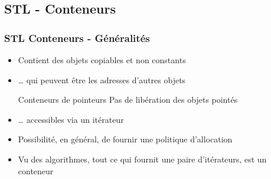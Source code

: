 \documentclass[C++.tex]{subfiles}
\begin{document}
\subsection*{STL - Conteneurs}
\begin{frame}[fragile]
	\frametitle{STL Conteneurs - Généralités}
	\begin{itemize}
		\item Contient des objets copiables et non constants


		\item \ldots{} qui peuvent être les adresses d'autres objets

		\begin{alertblock}{Conteneurs de pointeurs}
			Pas de libération des objets \og pointés\fg{}
		\end{alertblock}

		\item \ldots{} accessibles via un itérateur
		\item Possibilité, en général, de fournir une politique d'allocation
		\item Vu des algorithmes, tout ce qui fournit une paire d'itérateurs, est un conteneur
	\end{itemize}
\end{frame}
\end{document}
